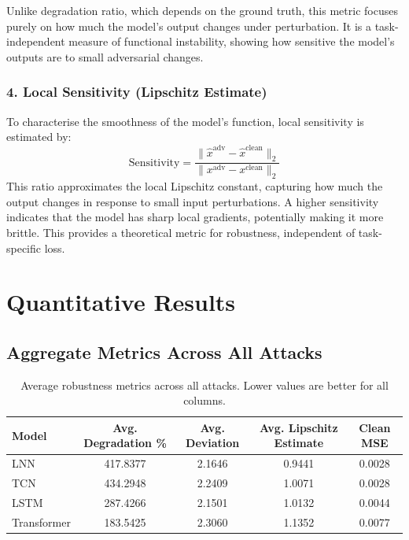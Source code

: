 Unlike degradation ratio, which depends on the ground truth, this metric focuses purely on how much the model's output changes under perturbation. It is a task-independent measure of functional instability, showing how sensitive the model's outputs are to small adversarial changes.

\subsubsection*{4. Local Sensitivity (Lipschitz Estimate)}
To characterise the smoothness of the model's function, local sensitivity is estimated by:
\[
\text{Sensitivity} = \frac{\| \hat{x}^{\text{adv}} - \hat{x}^{\text{clean}} \|_2}{\| x^{\text{adv}} - x^{\text{clean}} \|_2}
\]
This ratio approximates the local Lipschitz constant, capturing how much the output changes in response to small input perturbations. A higher sensitivity indicates that the model has sharp local gradients, potentially making it more brittle. This provides a theoretical metric for robustness, independent of task-specific loss.

\section{Quantitative Results}

\subsection*{Aggregate Metrics Across All Attacks}

\begin{table}[H]
    \centering
    \begin{tabular}{|l|c|c|c|c|}
    \hline
    \textbf{Model} & \textbf{Avg. Degradation \%} & \textbf{Avg. Deviation} & \textbf{Avg. Lipschitz Estimate} & \textbf{Clean MSE} \\
    \hline
    LNN         & 417.8377 & 2.1646 & 0.9441 & 0.0028 \\
    TCN         & 434.2948 & 2.2409 & 1.0071 & 0.0028 \\
    LSTM        & 287.4266 & 2.1501 & 1.0132 & 0.0044 \\
    Transformer & 183.5425 & 2.3060 & 1.1352 & 0.0077 \\
    \hline
    \end{tabular}
    \caption{Average robustness metrics across all attacks. Lower values are better for all columns.}
    \label{tab:avg_model_robustness}
\end{table}

